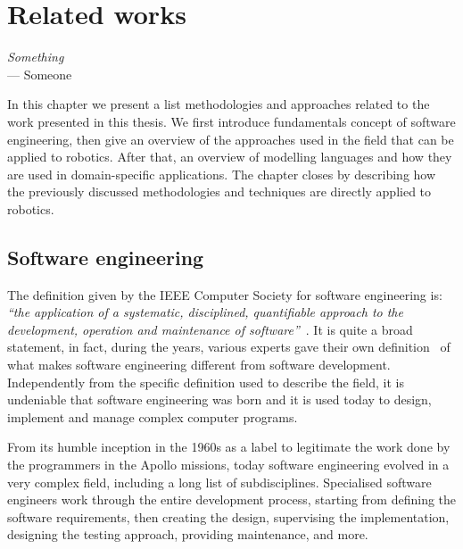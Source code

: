 \chapter[Related works]{Related works}\label{ch:Related}
\begin{flushright}{\slshape Something} \\ \medskip
    ---  Someone
\end{flushright}

In this chapter we present a list methodologies and approaches related to the work presented in this thesis. We first introduce fundamentals concept of software engineering, then give an overview of the approaches used in the field that can be applied to robotics. After that, an overview of modelling languages and how they are used in domain-specific applications. The chapter closes by describing how the previously discussed methodologies and techniques are directly applied to robotics.

\minitoc
\newpage

\section{Software engineering}
The definition given by the IEEE Computer Society for software engineering is: \textit{``the application of a systematic, disciplined, quantifiable approach to the development, operation and maintenance of software''}~\cite{abran2004software}. It is quite a broad statement, in fact, during the years, various experts gave their own definition~\cite{sommerville2011software, ieee1990ieee, pressman2005software} of what makes software engineering different from software development. Independently from the specific definition used to describe the field, it is undeniable that software engineering was born and it is used today to design, implement and manage complex computer programs.

From its humble inception in the 1960s as a label to legitimate the work done by the programmers in the Apollo missions, today software engineering evolved in a very complex field, including a long list of subdisciplines. Specialised software engineers work through the entire development process, starting from defining the software requirements, then creating the design, supervising the implementation, designing the testing approach, providing maintenance, and more.

